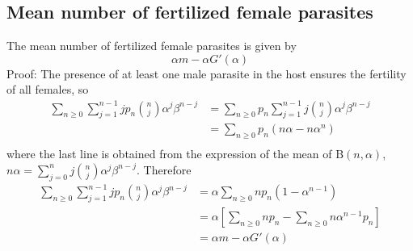 \documentclass[useAMS,referee,usenatbib]{biom}
\begin{document}
\subsection{Mean number of fertilized female parasites}%
	The mean number of fertilized female parasites is given by     
	\begin{equation}\label{hembrasfecun}
	\alpha  m - \alpha G'(\alpha)
	\end{equation}
		Proof: The presence of at least one male parasite in the host ensures the fertility of all females, so
		\begin{equation*}
		\begin{split}
		\sum_{n\geq 0}\sum_{j=1}^{n-1}j p_n\binom{n}{j}\alpha^j\beta^{n-j}
		&=\sum_{n\geq 0}p_n\sum_{j=1}^{n-1} j\binom{n}{j}\alpha^j\beta^{n-j}\\
		&=\sum_{n\geq 0}p_n(n\alpha-n\alpha^n)\\
		\end{split}
		\end{equation*}
		where the last line is obtained from the expression of the mean of $\mathrm{B}(n,\alpha)$, $n\alpha=\sum_{j=0}^{n} j\binom{n} {j}\alpha^j\beta^{n-j}$. Therefore
		\begin{equation*}
		\begin{split}
		\sum_{n\geq 0}\sum_{j=1}^{n-1}jp_n\binom{n}{j}\alpha^j\beta^{n-j}
		&=\alpha\sum_{n\geq 0}np_n(1-\alpha^{n-1})\\
		&=\alpha \left[ \sum_{n\geq 0}np_n-\sum_{n\geq 0}n\alpha ^{n-1}p_n\right] \\
		&= \alpha  m - \alpha G'(\alpha) 
		\end{split}
		\end{equation*}
\end{document}
